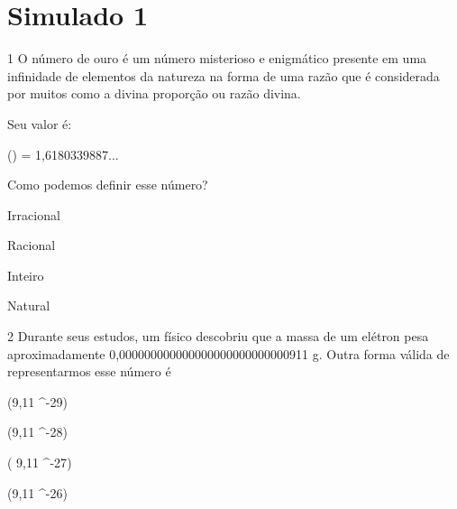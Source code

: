 
\section*{Simulado 1}

\num{1} O número de ouro é um número misterioso e enigmático presente em uma
infinidade de elementos da natureza na forma de uma razão que é
considerada por muitos como a divina proporção ou razão divina.

Seu valor é:

() = 1,6180339887...

Como podemos definir esse número?
\item Irracional
\item Racional
\item Inteiro
\item Natural






\num{2} Durante seus estudos, um físico descobriu que a massa de um elétron
pesa aproximadamente 0,000000000000000000000000000911 g. Outra forma
válida de representarmos esse número é
\item (9,11 ^{-29})
\item (9,11 ^{-28})
\item ( 9,11 ^{-27})
\item (9,11 ^{-26})





